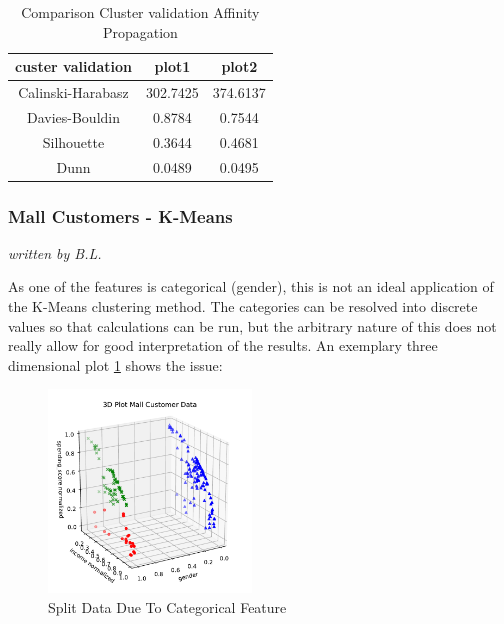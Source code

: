 \begin{table}[H]
	\centering
	\begin{tabular}{||c c c ||} 
		\hline
		custer validation & plot1 & plot2 \\ [0.5ex] 
		\hline\hline
		Calinski-Harabasz & 302.7425	 &  374.6137  \\ 
		Davies-Bouldin & 0.8784	 & 0.7544	 \\
		Silhouette & 0.3644	 & 0.4681	 \\
		Dunn & 0.0489 & 0.0495  \\ [1ex] 
		\hline
	\end{tabular}
	\caption{Comparison Cluster validation Affinity Propagation}
	
\end{table}

\subsubsection{Mall Customers - K-Means}
\textit{written by B.L.}\\
\label{sec:mall_kmeans_evaluation}

As one of the features is categorical (gender), this is not an ideal application of the K-Means clustering method. The categories can be resolved into discrete values so that calculations can be run, but the arbitrary nature of this does not really allow for good interpretation of the results. An exemplary three dimensional plot \ref{fig:kmeans_customers_3d} shows the issue: 

\begin{figure}
  \centering
    \includegraphics[width=0.48\textwidth, clip]{images/kmeans_customers_3d.pdf}
  \caption{Split Data Due To {Categorical} Feature}
  \label{fig:kmeans_customers_3d}
\end{figure}

